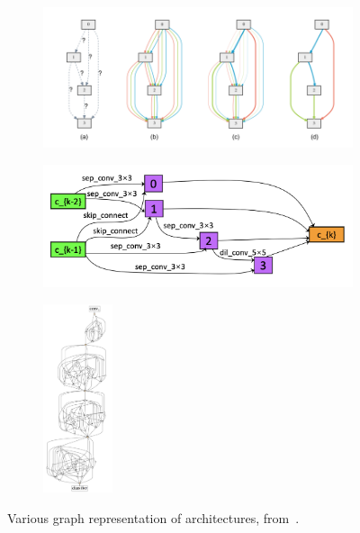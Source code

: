 \begin{figure}
    \centering
        \begin{subfigure}{.3\textwidth}
            \centering
            \includegraphics[trim={10cm .7cm 0 0cm},clip]{DARTS_cell}
        \end{subfigure}
        \begin{subfigure}{.3\textwidth}
            \centering
            \includegraphics[width=1.3\textwidth]{pcdartscell}
        \end{subfigure}
        \begin{subfigure}{.3\textwidth}
            \centering
            \includegraphics[height=15em]{random_wiring2}
        \end{subfigure}
    \caption[Graph representations of architectures]{Various graph representation of architectures, from~\cite{liu2018,xu2020,xi2019}.}
    \label{fig:arch_graph}
\end{figure}

